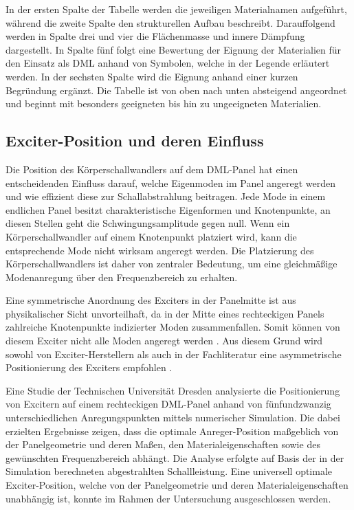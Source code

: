 In der ersten Spalte der Tabelle werden die jeweiligen Materialnamen aufgeführt, während die zweite Spalte den strukturellen Aufbau beschreibt. Darauffolgend werden in Spalte drei und vier die Flächenmasse und innere Dämpfung dargestellt. In Spalte fünf folgt eine Bewertung der Eignung der Materialien für den Einsatz als DML anhand von Symbolen, welche in der Legende erläutert werden. In der sechsten Spalte wird die Eignung anhand einer kurzen Begründung ergänzt. Die Tabelle ist von oben nach unten absteigend angeordnet und beginnt mit besonders geeigneten bis hin zu ungeeigneten Materialien. 


\subsection{Exciter-Position und deren Einfluss}

Die Position des Körperschallwandlers auf dem DML-Panel hat einen entscheidenden Einfluss darauf, welche Eigenmoden im Panel angeregt werden und wie effizient diese zur Schallabstrahlung beitragen. Jede Mode in einem endlichen Panel besitzt charakteristische Eigenformen und Knotenpunkte, an diesen Stellen geht die Schwingungsamplitude gegen null. Wenn ein Körperschallwandler auf einem Knotenpunkt platziert wird, kann die entsprechende Mode nicht wirksam angeregt werden. Die Platzierung des Körperschallwandlers ist daher von zentraler Bedeutung, um eine gleichmäßige Modenanregung über den Frequenzbereich zu erhalten. 

Eine symmetrische Anordnung des Exciters in der Panelmitte ist aus physikalischer Sicht unvorteilhaft, da in der Mitte eines rechteckigen Panels zahlreiche Knotenpunkte indizierter Moden zusammenfallen. Somit können von diesem Exciter nicht alle Moden angeregt werden \cite{Moeser2010}. Aus diesem Grund wird sowohl von Exciter-Herstellern als auch in der Fachliteratur eine asymmetrische Positionierung des Exciters empfohlen \cite{Bai2001, DaytonAudio2024}.

Eine Studie der Technischen Universität Dresden analysierte die Positionierung von Excitern auf einem rechteckigen DML-Panel anhand von fünfundzwanzig unterschiedlichen Anregungspunkten mittels numerischer Simulation. Die dabei erzielten Ergebnisse zeigen, dass die optimale Anreger-Position maßgeblich von der Panelgeometrie und deren Maßen, den Materialeigenschaften sowie des gewünschten Frequenzbereich abhängt. Die Analyse erfolgte auf Basis der in der Simulation berechneten abgestrahlten Schallleistung. Eine universell optimale Exciter-Position, welche von der Panelgeometrie und deren Materialeigenschaften unabhängig ist, konnte im Rahmen der Untersuchung ausgeschlossen werden. \cite{Zenker2019}

